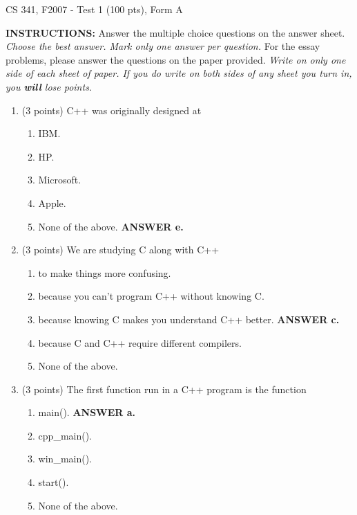 \documentclass{article}
\newcommand{\ans}[1]{ \ifnum\showans=1 {\bf ANSWER #1.} \fi }
\begin{document}
{ \Large
\begin{center}
CS 341, F2007 - Test 1 (100 pts), Form A
\end{center}
}

\vspace{.1in}

\noindent
{\Large\bf INSTRUCTIONS:} Answer the multiple choice questions on the
answer sheet.  {\em Choose the best answer.  Mark only one answer per
question.}  For the essay problems, please answer the questions on the
paper provided.  {\em Write on only one side of each sheet of paper.
If you do write on both sides of any sheet you turn in, you {\bf will}
lose points.}

\vspace{.1in}

\begin{enumerate}

\item (3 points) C++ was originally designed at
  \begin{enumerate}
  \item IBM.
  \item HP.
  \item Microsoft.
  \item Apple.
  \item None of the above.  \ans{e}
  \end{enumerate}

\item (3 points) We are studying C along with C++ 
  \begin{enumerate}
  \item to make things more confusing.
  \item because you can't program C++ without knowing C.
  \item because knowing C makes you understand C++ better. \ans{c}
  \item because C and C++ require different compilers.
  \item None of the above.
  \end{enumerate}

\item (3 points) The first function run in a C++ program is the function
  \begin{enumerate}
  \item main().  \ans{a}
  \item cpp\_main().
  \item win\_main().
  \item start().
  \item None of the above.
  \end{enumerate}


\end{enumerate}
\end{document}
